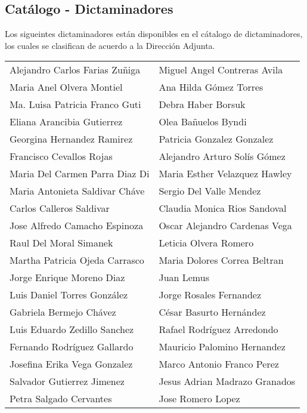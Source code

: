 \subsection{Catálogo - Dictaminadores}
\label{appendix:Catalogo:Dictaminadores}

Los sigueintes dictaminadores están disponibles en el cátalogo de dictaminadores, los cuales se clasifican de acuerdo a la Dirección Adjunta.\\

\begin{tabular}{ m{} m{}  }%
Alejandro Carlos Farias Zuñiga & Miguel Angel Contreras Avila \\
Maria Anel Olvera Montiel & Ana Hilda Gómez Torres \\
Ma. Luisa Patricia Franco Guti & Debra Haber Borsuk \\
Eliana Arancibia Gutierrez & Olea Bañuelos Byndi\\
Georgina Hernandez Ramirez & Patricia Gonzalez Gonzalez \\
Francisco Cevallos Rojas & Alejandro Arturo Solís Gómez \\
Maria Del Carmen Parra Diaz Di & Maria Esther Velazquez Hawley \\
Maria Antonieta Saldivar Cháve & Sergio Del Valle Mendez \\
Carlos Calleros Saldivar & Claudia Monica Rios Sandoval \\
Jose Alfredo Camacho Espinoza & Oscar Alejandro Cardenas Vega \\
Raul Del Moral Simanek & Leticia Olvera Romero \\
Martha Patricia Ojeda Carrasco & Maria Dolores Correa Beltran \\
Jorge Enrique Moreno Diaz & Juan Lemus \\
Luis Daniel Torres González & Jorge Rosales Fernandez \\
Gabriela Bermejo Chávez & César Basurto Hernández \\
Luis Eduardo Zedillo Sanchez & Rafael Rodríguez Arredondo \\
Fernando Rodríguez Gallardo & Mauricio Palomino Hernandez \\
Josefina Erika Vega Gonzalez & Marco Antonio Franco Perez \\
Salvador Gutierrez Jimenez & Jesus Adrian Madrazo Granados \\
Petra Salgado Cervantes & Jose Romero Lopez \\

\end{tabular}
